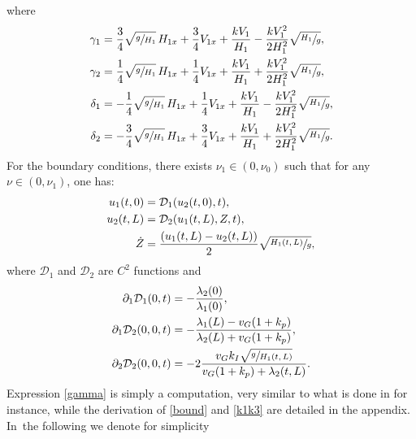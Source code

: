 where\vspace*{-7pt}
\begin{equation}
\begin{split}
\gamma_{1}&=\frac{3}{4}\sqrt{\sfrac{g}{H_{1}}}\,H_{1x}+\frac{3}{4}V_{1x}+\frac{kV_{1}}{H_{1}}-\frac{kV_{1}^{2}}{2H_{1}^{2}}\sqrt{\sfrac{H_{1}}{g}},\\
\gamma_{2}&=\frac{1}{4}\sqrt{\sfrac{g}{H_{1}}}\,H_{1x}+\frac{1}{4}V_{1x}+\frac{kV_{1}}{H_{1}}+\frac{kV_{1}^{2}}{2H_{1}^{2}}\sqrt{\sfrac{H_{1}}{g}},\\
\delta_{1}&=-\frac{1}{4}\sqrt{\sfrac{g}{H_{1}}}\,H_{1x}+\frac{1}{4}V_{1x}+\frac{kV_{1}}{H_{1}}-\frac{kV_{1}^{2}}{2H_{1}^{2}}\sqrt{\sfrac{H_{1}}{g}},\\
\delta_{2}&=-\frac{3}{4}\sqrt{\sfrac{g}{H_{1}}}\,H_{1x}+\frac{3}{4}V_{1x}+\frac{kV_{1}}{H_{1}}+\frac{kV_{1}^{2}}{2H_{1}^{2}}\sqrt{\sfrac{H_{1}}{g}}.
\end{split}
\label{gamma}
\end{equation}
{For} the boundary conditions, there exists $\nu_{1}\in(0,\nu_{0})$ such that for any $\nu\in(0,\nu_{1})$, one has:\vspace*{-5pt}
\begin{equation}
\begin{split}
u_{1}(t,0)&=\mathcal{D}_{1}(u_{2}(t,0),t),\\
u_{2}(t,L)&=\mathcal{D}_{2}(u_{1}(t,L),Z,t),\\
\dot Z&=\frac{(u_{1}(t,L)-u_{2}(t,L))}{2}\sqrt{\sfrac{H_{1}(t,L)}{g}},
\end{split}
\label{bound}
\end{equation}
where $\mathcal{D}_{1}$ and $\mathcal{D}_{2}$ are $C^{2}$ functions and\vspace*{-5pt}
\begin{equation}
\begin{split}
\partial_{1}\mathcal{D}_{1}(0,t)&=-\frac{\lambda_{2}(0)}{\lambda_{1}(0)},\\
\partial_{1}\mathcal{D}_{2}(0,0,t)&=-\frac{\lambda_{1}(L)-v_{G}(1+k_{p})}{\lambda_{2}(L)+v_{G}(1+k_{p})},\\
\partial_{2}\mathcal{D}_{2}(0,0,t)&=-2\frac{v_{G}k_{I}\sqrt{\sfrac{g}{H_{1}(t,L)}}}{v_{G}(1+k_{p})+\lambda_{2}(t,L)}.
\end{split}
\label{k1k3}
\end{equation}
Expression \eqref{gamma} is simply a computation, very similar to what is done in \cite{HS} for instance, while the derivation of \eqref{bound} and \eqref{k1k3} are detailed in the appendix. In~the following we denote for simplicity
